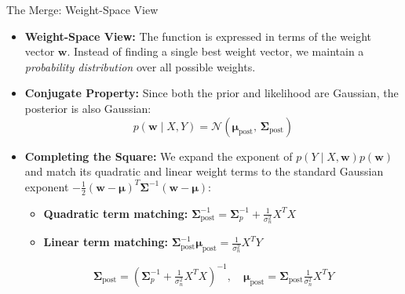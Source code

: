 \documentclass[aspectratio=169, 10pt,handout]{beamer}
\newcommand{\N}{\mathcal{N}}
\newcommand{\bw}{\mathbf{w}}
\newcommand{\bmu}{\boldsymbol{\mu}}
\newcommand{\bSigma}{\boldsymbol{\Sigma}}
\newcommand{\sn}{\sigma_n^2}
\begin{document}
\begin{frame}{The Merge: Weight-Space View}

  \begin{itemize}
    \item \textbf{Weight-Space View:} The function is expressed in terms of the
      weight vector $\bw$.  Instead of finding a single best weight vector,
      we maintain a \emph{probability distribution} over all possible weights.
    \item \textbf{Conjugate Property:} Since both the prior and likelihood are
      Gaussian, the posterior is also Gaussian:
      \[
        p(\bw\mid X, Y)=\N(\bmu_{\text{post}},\,\bSigma_{\text{post}})
      \]
    \item \textbf{Completing the Square:} We expand the exponent of $p(Y\mid X,\bw)p(\bw)$ and match its quadratic and linear weight terms to the standard Gaussian exponent $-\frac{1}{2}(\bw-\bmu)^T\bSigma^{-1}(\bw-\bmu)$:
      \begin{itemize}
        \item \textbf{Quadratic term matching:} $\bSigma_{\text{post}}^{-1} = \bSigma_p^{-1} + \frac{1}{\sigma_n^2}X^TX$
        \item \textbf{Linear term matching:} $\bSigma_{\text{post}}^{-1}\bmu_{\text{post}} = \frac{1}{\sigma_n^2}X^T Y$
      \end{itemize}
      \[
        \bSigma_{\text{post}} = \left(\bSigma_p^{-1}+\tfrac{1}{\sn}X^TX\right)^{-1},
        \quad
        \bmu_{\text{post}} = \bSigma_{\text{post}}\tfrac{1}{\sn}X^T Y
      \]
  \end{itemize}

\end{frame}
\end{document}
